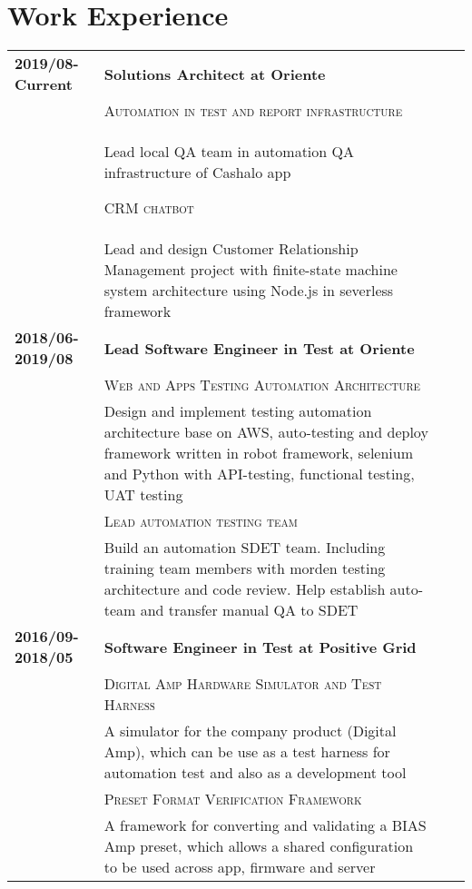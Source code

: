 \documentclass[a4paper,pt]{article}
\begin{document}
\section{Work Experience}
\begin{itemize}
\begin{tabular}{lp{10cm}p{10cm}p{1cm}}
\textbf{2019/08-Current}&\textbf {Solutions Architect at Oriente}\\
&\item\textsc{Automation in test and report infrastructure}\\&\footnotesize{\qquad Lead local QA team in automation QA infrastructure of Cashalo app}\item\textsc{CRM chatbot}\\&
\footnotesize{\qquad Lead and design Customer Relationship Management project with finite-state machine system architecture using Node.js in severless framework}\\
\textbf{2018/06-2019/08}&\textbf {Lead Software Engineer in Test at Oriente}\\
&\item\textsc{Web and Apps Testing Automation Architecture}\\&
\footnotesize{\qquad Design and implement testing automation architecture base on AWS, auto-testing and deploy framework written in robot framework, selenium and Python with API-testing, functional testing, UAT testing}\\
&\item\textsc{Lead automation testing team}\\&
\footnotesize{\qquad Build an automation SDET team. Including training team members with morden testing architecture and code review. Help establish auto-team and transfer manual QA to SDET}\\
\textbf{2016/09-2018/05}&\textbf {Software Engineer in Test at Positive Grid}\\
&\item\textsc{Digital Amp Hardware Simulator and Test Harness}\\&
\footnotesize{\qquad A simulator for the company product (Digital Amp), which can be use as a test harness for automation test and also as a development tool}\\
&\item\textsc{Preset Format Verification Framework}\\&
\footnotesize{\qquad A framework for converting and validating a BIAS Amp preset, which allows a shared configuration to be used across app, firmware and server}\\



\end{tabular}
\end{itemize}
\end{document}
